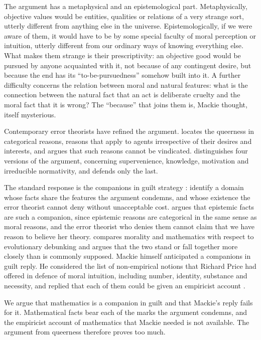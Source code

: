\documentclass{situationist-preprint}
\begin{document}
The argument has a metaphysical and an epistemological part. Metaphysically, objective values would be entities, qualities or relations of a very strange sort, utterly different from anything else in the universe. Epistemologically, if we were aware of them, it would have to be by some special faculty of moral perception or intuition, utterly different from our ordinary ways of knowing everything else. What makes them strange is their prescriptivity: an objective good would be pursued by anyone acquainted with it, not because of any contingent desire, but because the end has its \enquote{to-be-pursuedness} somehow built into it. A further difficulty concerns the relation between moral and natural features: what is the connection between the natural fact that an act is deliberate cruelty and the moral fact that it is wrong? The \enquote{because} that joins them is, Mackie thought, itself mysterious.

Contemporary error theorists have refined the argument. \citet{Joyce2001} locates the queerness in categorical reasons, reasons that apply to agents irrespective of their desires and interests, and argues that such reasons cannot be vindicated. \citet{Olson2014} distinguishes four versions of the argument, concerning supervenience, knowledge, motivation and irreducible normativity, and defends only the last.

The standard response is the companions in guilt strategy \citep{Lillehammer2007}: identify a domain whose facts share the features the argument condemns, and whose existence the error theorist cannot deny without unacceptable cost. \citet{Cuneo2007} argues that epistemic facts are such a companion, since epistemic reasons are categorical in the same sense as moral reasons, and the error theorist who denies them cannot claim that we have reason to believe her theory. \citet{ClarkeDoane2012} compares morality and mathematics with respect to evolutionary debunking and argues that the two stand or fall together more closely than is commonly supposed. Mackie himself anticipated a companions in guilt reply. He considered the list of non-empirical notions that Richard Price had offered in defence of moral intuition, including number, identity, substance and necessity, and replied that each of them could be given an empiricist account \citep[ch.~1, \S 9]{Mackie1977}.

We argue that mathematics is a companion in guilt and that Mackie's reply fails for it. Mathematical facts bear each of the marks the argument condemns, and the empiricist account of mathematics that Mackie needed is not available. The argument from queerness therefore proves too much.
\end{document}
